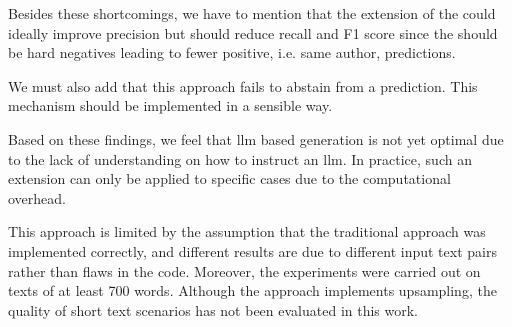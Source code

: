 Besides these shortcomings, we have to mention that the extension of the \impAppr{} could ideally improve precision but should reduce recall and F1 score since the \imps{} should be hard negatives leading to fewer positive, i.e. same author, predictions.

We must also add that this approach fails to abstain from a prediction.
This mechanism should be implemented in a sensible way.

Based on these findings, we feel that \ac{llm} based \imp{} generation is not yet optimal due to the lack of understanding on how to instruct an \ac{llm}.
In practice, such an extension can only be applied to specific cases due to the computational overhead.

This approach is limited by the assumption that the traditional approach was implemented correctly, and different results are due to different input text pairs rather than flaws in the code.
Moreover, the experiments were carried out on texts of at least 700 words.
Although the approach implements upsampling, the quality of short text scenarios has not been evaluated in this work.
 